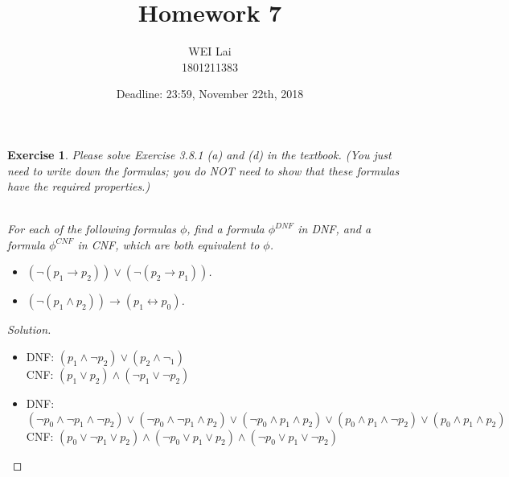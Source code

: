 \documentclass[12pt,a4paper]{article}
\title{Homework 7}
\author{WEI Lai\\
1801211383}
\date{Deadline: 23:59, November 22th, 2018}
\theoremstyle{plain}
\newtheorem{exercise}{Exercise}
\begin{document}
\maketitle



\begin{exercise}
Please solve Exercise 3.8.1 (a) and (d) in the textbook. 
(You just need to write down the formulas; you do NOT need to show that these formulas have the required properties.)

\ \\
For each of the following formulas $\phi$, find a formula $\phi^{DNF}$ in DNF, and a formula $\phi^{CNF}$ in CNF, which are both equivalent to $\phi$.
%
\begin{itemize}

\item[(a)] $( \neg ( p_1 \rightarrow p_2 ) ) \vee ( \neg ( p_2 \rightarrow p_1 ) )$.

\item[(d)] $( \neg ( p_1 \wedge p_2 ) ) \rightarrow ( p_1 \leftrightarrow p_0 )$.

\end{itemize}
\end{exercise}

\begin{proof}[Solution]\
    \begin{itemize}
        \item[(a)]
            DNF: $(p_1 \wedge \neg p_2)\vee(p_2 \wedge \neg_1)$\\
            CNF: $(p_1 \vee p_2)\wedge (\neg p_1 \vee \neg p_2)$
        \item[(d)]
            DNF: $(\neg p_0 \wedge \neg p_1 \wedge \neg p_2) \vee (\neg p_0 \wedge \neg p_1 \wedge p_2) \vee (\neg p_0 \wedge p_1 \wedge p_2) \vee (p_0 \wedge p_1 \wedge \neg p_2) \vee (p_0 \wedge p_1 \wedge p_2)$\\
            CNF: $(p_0 \vee \neg p_1 \vee p_2) \wedge (\neg p_0 \vee p_1 \vee p_2) \wedge (\neg p_0 \vee p_1 \vee \neg p_2) $
           
    \end{itemize}
\end{proof}
\end{document}
